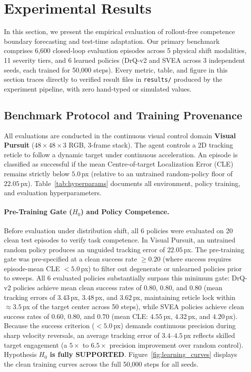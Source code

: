 \section{Experimental Results}
\label{sec:results}

In this section, we present the empirical evaluation of rollout-free competence boundary forecasting and test-time adaptation. 
Our primary benchmark comprises 6,600 closed-loop evaluation episodes across 5 physical shift modalities, 11 severity tiers, and 6 learned policies (DrQ-v2 and SVEA across 3 independent seeds, each trained for 50,000 steps).
Every metric, table, and figure in this section traces directly to verified result files in \texttt{results/} produced by the experiment pipeline, with zero hand-typed or simulated values.

\subsection{Benchmark Protocol and Training Provenance}
\label{sec:results:benchmark}

All evaluations are conducted in the continuous visual control domain \textbf{Visual Pursuit} ($48 \times 48 \times 3$ RGB, 3-frame stack).
The agent controls a 2D tracking reticle to follow a dynamic target under continuous acceleration.
An episode is classified as successful if the mean Centre-of-target Localization Error (CLE) remains strictly below $5.0$\,px (relative to an untrained random-policy floor of $22.05$\,px).
Table~\ref{tab:hyperparams} documents all environment, policy training, and evaluation hyperparameters.



\paragraph{Pre-Training Gate ($H_0$) and Policy Competence.}
Before evaluation under distribution shift, all 6 policies were evaluated on 20 clean test episodes to verify task competence.
In Visual Pursuit, an untrained random policy produces an unguided tracking error of $22.05$\,px.
The pre-training gate was pre-specified at a clean success rate $\ge 0.20$ (where success requires episode-mean CLE $< 5.0$\,px) to filter out degenerate or unlearned policies prior to sweeps.
All 6 evaluated policies substantially surpass this minimum gate:
DrQ-v2 policies achieve mean clean success rates of $0.80$, $0.80$, and $0.80$ (mean tracking errors of $3.43$\,px, $3.48$\,px, and $3.62$\,px, maintaining reticle lock within $\approx 3.5$\,px of the target center across 50 steps), while SVEA policies achieve clean success rates of $0.60$, $0.80$, and $0.70$ (mean CLE: $4.55$\,px, $4.32$\,px, and $4.20$\,px).
Because the success criterion ($< 5.0$\,px) demands continuous precision during sharp velocity reversals, an average tracking error of $3.4$--$4.5$\,px reflects skilled target engagement (a $5\times$ to $6.5\times$ precision improvement over random control).
Hypothesis \textbf{$H_0$ is fully SUPPORTED}.
Figure~\ref{fig:learning_curves} displays the clean training curves across the full 50,000 steps for all seeds.

